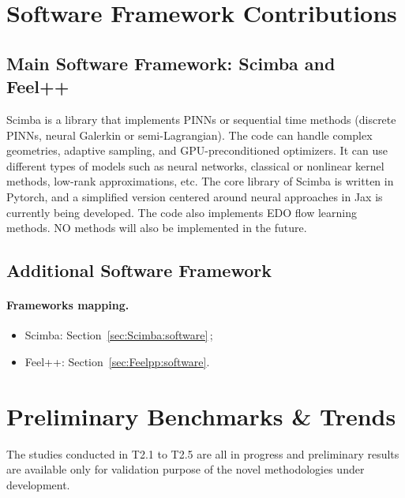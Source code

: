 \section{Software Framework Contributions}

\subsection{Main Software Framework: Scimba and Feel++}

Scimba is a  library that implements PINNs or  sequential time methods
(discrete PINNs,  neural Galerkin  or semi-Lagrangian).  The  code can
handle complex  geometries, adaptive sampling,  and GPU-preconditioned
optimizers.   It can  use different  types  of models  such as  neural
networks,   classical   or    nonlinear   kernel   methods,   low-rank
approximations,  etc.   The  core  library of  Scimba  is  written  in
Pytorch, and a simplified version centered around neural approaches in
Jax is  currently being developed.  The code also implements  EDO flow
learning methods.  NO methods will also be implemented in the future.

\subsection{Additional Software Framework}


\paragraph{Frameworks mapping.}
\begin{itemize}
  \item Scimba: Section~\ref{sec:Scimba:software}\,; 
  \item Feel++: Section~\ref{sec:Feelpp:software}.
\end{itemize}

\section{Preliminary Benchmarks \& Trends}

The  studies  conducted in  T2.1  to  T2.5  are  all in  progress  and
preliminary results are  available only for validation  purpose of the
novel methodologies under development. 

